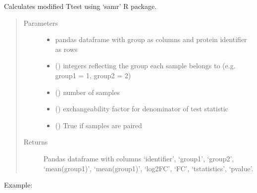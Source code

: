 \documentclass[letterpaper,10pt,english]{sphinxmanual}
\begin{document}
\begin{fulllineitems}
\label{\detokenize{_autosummary/analytics_core.analytics:analytics_core.analytics.analytics.calculate_ttest_samr}}
Calculates modified T\sphinxhyphen{}test using ‘samr’ R package.
\begin{quote}\begin{description}
\item[{Parameters}] \leavevmode\begin{itemize}
\item {} 
 \textendash{} pandas dataframe with group as columns and protein identifier as rows

\item {} 
 () \textendash{} integers reflecting the group each sample belongs to (e.g. group1 = 1, group2 = 2)

\item {} 
 () \textendash{} number of samples

\item {} 
 () \textendash{} exchangeability factor for denominator of test statistic

\item {} 
 () \textendash{} True if samples are paired

\end{itemize}

\item[{Returns}] \leavevmode
Pandas dataframe with columns ‘identifier’, ‘group1’, ‘group2’, ‘mean(group1)’, ‘mean(group1)’, ‘log2FC’, ‘FC’, ‘t\sphinxhyphen{}statistics’, ‘p\sphinxhyphen{}value’.

\end{description}\end{quote}

Example:

\begin{sphinxVerbatim}[commandchars=\\\{\}]
      
\end{sphinxVerbatim}

\end{fulllineitems}
\end{document}
